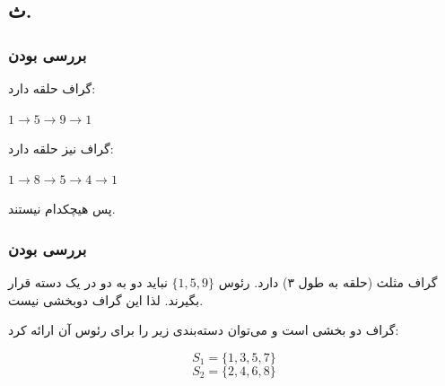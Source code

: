 \documentclass{article}
\begin{document}
\begin{multicols}{2}
\pagebreak

\subsection*{ث.}

\subsubsection*{بررسی  بودن}
گراف
حلقه دارد:
\begin{LTR}
$1 \rightarrow 5 \rightarrow 9 \rightarrow 1$
\end{LTR}

گراف
نیز حلقه دارد:
\begin{LTR}
$1 \rightarrow 8 \rightarrow 5 \rightarrow 4 \rightarrow 1$
\end{LTR}
پس هیچکدام
نیستند.

\subsubsection*{بررسی  بودن}
گراف
مثلث (حلقه به طول ۳) دارد. رئوس 
$\{1, 5, 9\}$
نباید دو به دو در یک دسته قرار بگیرند. لذا این گراف دوبخشی نیست.

گراف
دو بخشی است  و می‌توان دسته‌بندی زیر را برای رئوس آن ارائه کرد:
\begin{LTR}
$$S_1 = \{ 1, 3, 5, 7 \}$$
$$S_2 = \{ 2, 4, 6, 8 \}$$
\end{LTR}


\end{multicols}
\end{document}

